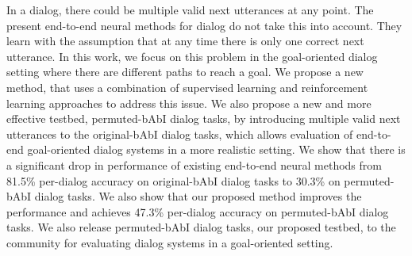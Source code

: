 In a dialog, there could be multiple valid next utterances at any point. The present end-to-end neural methods for dialog do not take this into account. They learn with the assumption that at any time there is only one correct next utterance. In this work, we focus on this problem in the goal-oriented dialog setting where there are different paths to reach a goal. We propose a new method, that uses a combination of supervised learning and reinforcement learning approaches to address this issue. We also propose a new and more effective testbed, permuted-bAbI dialog tasks, by introducing multiple valid next utterances to the original-bAbI dialog tasks, which allows evaluation of end-to-end goal-oriented dialog systems in a more realistic setting. We show that there is a significant drop in performance of existing end-to-end neural methods from 81.5\% per-dialog accuracy on original-bAbI dialog tasks to 30.3\% on permuted-bAbI dialog tasks. We also show that our proposed method improves the performance and achieves 47.3\% per-dialog accuracy on permuted-bAbI dialog tasks. We also release permuted-bAbI dialog tasks, our proposed testbed, to the community for evaluating dialog systems in a goal-oriented setting.
